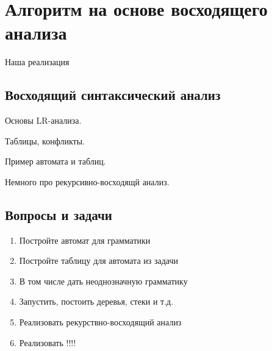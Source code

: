 \section{Алгоритм на основе восходящего анализа}

Наша реализация~\cite{10.1007/978-3-319-41579-6_22}

\subsection{Восходящий синтаксический анализ}

Основы LR-анализа.

Таблицы, конфликты.

Пример автомата и таблиц.

Немного про рекурсивно-восходящй анализ.

\subsection{Вопросы и задачи}
\begin{enumerate}
\item Постройте автомат для грамматики
\item Постройте таблицу для автомата из задачи
\item В том числе дать неоднозначную грамматику
\item Запустить, постоить деревья, стеки и т.д.
\item Реализовать рекурствно-восходящий анализ
\item Реализовать !!!!
\end{enumerate}
